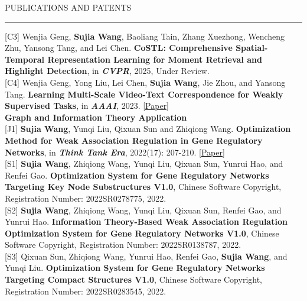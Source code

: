 \documentclass{resume} %
\renewenvironment{rSection}[1]{
\sectionskip
\textcolor{TsinghuaPurple}{\MakeUppercase{#1}}
\sectionlineskip
\hrule
\begin{list}{}{
\setlength{\leftmargin}{0em}
}
\item[]
}{
\end{list}
}
\begin{document}
\begin{rSection}{Publications and Patents}
{\label{c3}[C3] Wenjia Geng, \textbf{Sujia Wang}, Baoliang Tain, Zhang Xuezhong, Wencheng Zhu, Yansong Tang, and Lei Chen. \textbf{CoSTL: Comprehensive Spatial-Temporal Representation Learning for Moment Retrieval and Highlight Detection}, in \textit{\textbf{CVPR}}, 2025, Under Review.}\vspace{3pt}\\
{\label{c4}[C4] Wenjia Geng, Yong Liu, Lei Chen, \textbf{Sujia Wang}, Jie Zhou, and Yansong Tang. \textbf{Learning Multi-Scale Video-Text Correspondence for Weakly Supervised Tasks}, in \textit{\textbf{AAAI}}, 2023. \href{https://ojs.aaai.org/index.php/AAAI/article/view/27959}{[Paper]}}\vspace{7pt}\\
\textbf{\large{\textcolor{darkpurple}{Graph and Information Theory Application}}}\vspace{5pt}\\
{\label{j1}[J1] \textbf{Sujia Wang}, Yunqi Liu, Qixuan Sun and Zhiqiong Wang. \textbf{Optimization Method for Weak Association Regulation in Gene Regulatory Networks}, in \textit{\textbf{Think Tank Era}}, 2022(17): 207-210. \href{https://zhikushidai.oss-cn-beijing.aliyuncs.com/202217/17PDF/53.pdf}{[Paper]}}\vspace{3pt}\\
{\label{s1}[S1] \textbf{Sujia Wang}, Zhiqiong Wang, Yunqi Liu, Qixuan Sun, Yunrui Hao, and Renfei Gao. \textbf{Optimization System for Gene Regulatory Networks Targeting Key Node Substructures V1.0}, Chinese Software Copyright, Registration Number: 2022SR0278775, 2022.}\vspace{3pt}\\
{\label{s2}[S2] \textbf{Sujia Wang}, Zhiqiong Wang, Yunqi Liu, Qixuan Sun, Renfei Gao, and Yunrui Hao. \textbf{Information Theory-Based Weak Association Regulation Optimization System for Gene Regulatory Networks V1.0}, Chinese Software Copyright, Registration Number: 2022SR0138787, 2022.}\vspace{3pt}\\
{\label{s3}[S3] Qixuan Sun, Zhiqiong Wang, Yunrui Hao, Renfei Gao, \textbf{Sujia Wang}, and Yunqi Liu. \textbf{Optimization System for Gene Regulatory Networks Targeting Compact Structures V1.0}, Chinese Software Copyright, Registration Number: 2022SR0283545, 2022.}
\end{rSection}
\end{document}
